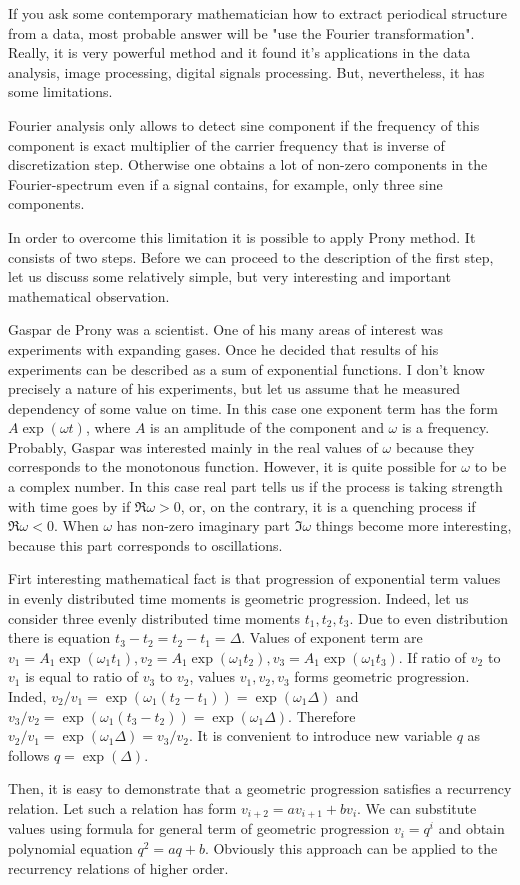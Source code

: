 \documentclass[14pt]{extarticle}
\begin{document}
If you ask some contemporary mathematician how to extract
periodical structure from a data, most probable answer will
be "use the Fourier transformation". Really, it is very
powerful method and it found it's applications in the
data analysis, image processing, digital signals processing.
But, nevertheless, it has some limitations.

Fourier analysis only allows to detect sine component if
the frequency of this component is exact multiplier
of the carrier frequency that is inverse of discretization
step. Otherwise one obtains a lot of non-zero components
in the Fourier-spectrum even if a signal contains, for example,
only three sine components.

In order to overcome this limitation it is possible to apply
Prony method. It consists of two steps. Before we can proceed
to the description of the first step, let us discuss some relatively
simple, but very interesting and important mathematical observation.

Gaspar de Prony was a scientist. One of his many areas of interest was
experiments with expanding gases. Once he decided that results of his
experiments can be described as a sum of exponential functions. I don't
know precisely a nature of his experiments, but let us assume that he
measured dependency of some value on time. In this case one exponent term
has the form $A\exp(\omega t)$, where $A$ is an amplitude of the component and
$\omega$ is a frequency. Probably, Gaspar was interested mainly in the real
values of $\omega$ because they corresponds to the monotonous function.
However, it is quite possible for $\omega$ to be a complex number. In this case
real part tells us if the process is taking strength with time goes by if \(\Re \omega > 0\), or,
on the contrary, it is a quenching process if \(\Re \omega < 0\). When \(\omega\)
has non-zero imaginary part $\Im \omega$ things become more interesting, because
this part corresponds to oscillations.

Firt interesting mathematical fact is that progression of exponential term values in evenly distributed time moments
is geometric progression. Indeed, let us consider three evenly distributed time moments 
$t_1, t_2, t_3$. Due to even distribution there is equation $t_3 - t_2 = t_2 - t_1 = \Delta$.
Values of exponent term are \(v_1 = A_1\exp(\omega_1 t_1), v_2 = A_1\exp(\omega_1 t_2), v_3 = A_1\exp(\omega_1 t_3)\).
If ratio of \(v_2\) to \(v_1\) is equal to ratio of \(v_3\) to \(v_2\), values \(v_1, v_2, v_3\) forms geometric progression.
Inded, \(v_2/v_1 = \exp(\omega_1(t_2 - t_1)) = \exp(\omega_1\Delta)\) and \(v_3/v_2 = \exp(\omega_1(t_3 - t_2)) = \exp(\omega_1\Delta)\).
Therefore \(v_2/v_1 = \exp(\omega_1\Delta) = v_3/v_2\). It is convenient to introduce
new variable \(q\) as follows \(q = \exp (\Delta)\).

Then, it is easy to demonstrate that a geometric progression satisfies a recurrency relation.
Let such a relation has form $v_{i+2} = a v_{i+1} + b v_{i}$. We can substitute values using
formula for general term of geometric progression \(v_i = q^i\) and obtain polynomial equation
\(q^2 = a q + b\). Obviously this approach can be applied to the recurrency relations of
higher order.
\end{document}
